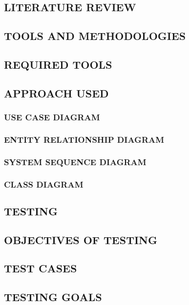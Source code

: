 \documentclass[a4paper, 14pt]{report}
\begin{document}
\begin{description}
	\begin{center}
		\chapter{LITERATURE REVIEW}
	\end{center}
	
	\begin{center}
		\chapter{TOOLS AND METHODOLOGIES}
	\end{center}
	
	\section{REQUIRED TOOLS}
	\section{APPROACH USED}
	\subsection{USE CASE DIAGRAM}
	\subsection{ENTITY RELATIONSHIP DIAGRAM}
	\subsection{SYSTEM SEQUENCE DIAGRAM}
	\subsection{CLASS DIAGRAM}
	
	\begin{center}
		\chapter{TESTING}
	\end{center}
	\section{OBJECTIVES OF TESTING}
	\section{TEST CASES}
	\section{TESTING GOALS}
	

\end{description}
\end{document}
